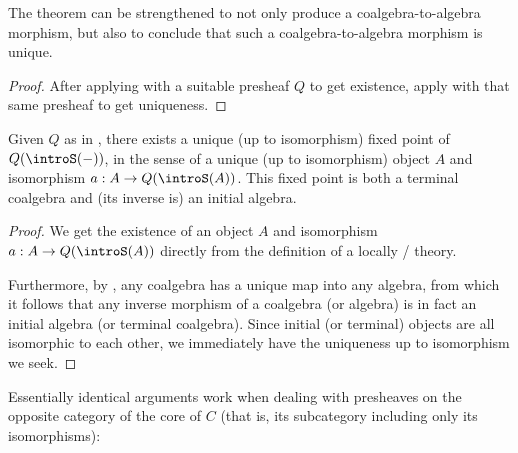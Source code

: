 \begin{theorem}\label{CoalgToAlgUnique}
The theorem  can be strengthened to not only produce a coalgebra-to-algebra morphism, but also to conclude that such a coalgebra-to-algebra morphism is unique.
\end{theorem}
\begin{proof}
After applying  with a suitable presheaf $Q$ to get existence, apply  with that same presheaf to get uniqueness.
\end{proof}

\begin{theorem}
Given $Q$ as in , there exists a unique (up to isomorphism) fixed point of $Q(\introS(-))$, in the sense of a unique (up to isomorphism) object $A$ and isomorphism $a : A \to Q(\introS(A))$. This fixed point is both a terminal coalgebra and (its inverse is) an initial algebra.
\end{theorem}
\begin{proof}
We get the existence of an object $A$ and isomorphism $a : A \to Q(\introS(A))$ directly from the definition of a locally \Loeb/ theory.

Furthermore, by , any coalgebra has a unique map into any algebra, from which it follows that any inverse morphism of a coalgebra (or algebra) is in fact an initial algebra (or terminal coalgebra). Since initial (or terminal) objects are all isomorphic to each other, we immediately have the uniqueness up to isomorphism we seek.
\end{proof}

Essentially identical arguments work when dealing with presheaves on the opposite category of the core of $C$ (that is, its subcategory including only its isomorphisms):

